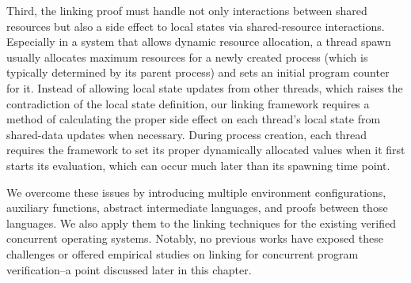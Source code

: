 Third, the linking proof must handle not only interactions between shared resources but also a side effect to local states via shared-resource interactions.
Especially in a system that allows dynamic resource allocation, a thread spawn usually allocates maximum resources for a newly created process
 (which is typically determined by its parent process) and sets an initial program counter for it. 
 Instead of allowing local state updates from other threads, which raises the contradiction of the local state definition, 
 our linking framework requires a method of calculating the proper side effect on each thread’s local state from shared-data updates when necessary. 
 During process creation, each thread requires the framework to set its proper dynamically allocated values when it first starts its evaluation, which can occur much later than its spawning time point.

We overcome these issues by introducing multiple environment configurations, auxiliary functions, abstract intermediate languages, and proofs between those languages. 
We also apply them to the linking techniques for the existing verified concurrent operating systems. 
Notably, no previous works have exposed these challenges or offered empirical studies on linking for concurrent program verification--a point discussed later in this chapter.

%
%


